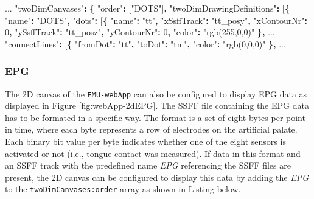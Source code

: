 \documentclass[]{book}
\newenvironment{Shaded}{\begin{snugshade}}{\end{snugshade}}
\newcommand{\DecValTok}[1]{\textcolor[rgb]{0.00,0.00,0.81}{#1}}
\newcommand{\NormalTok}[1]{#1}
\newcommand{\OperatorTok}[1]{\textcolor[rgb]{0.81,0.36,0.00}{\textbf{#1}}}
\newcommand{\StringTok}[1]{\textcolor[rgb]{0.31,0.60,0.02}{#1}}
\begin{document}
\begin{Shaded}
\begin{Highlighting}[]
\NormalTok{...}
\StringTok{"twoDimCanvases"}\OperatorTok{:} \OperatorTok{\{}
    \StringTok{"order"}\OperatorTok{:}\NormalTok{ [}\StringTok{"DOTS"}\NormalTok{]}\OperatorTok{,}
    \StringTok{"twoDimDrawingDefinitions"}\OperatorTok{:}\NormalTok{ [}\OperatorTok{\{}
        \StringTok{"name"}\OperatorTok{:} \StringTok{"DOTS"}\OperatorTok{,}
        \StringTok{"dots"}\OperatorTok{:}\NormalTok{ [}\OperatorTok{\{}
            \StringTok{"name"}\OperatorTok{:} \StringTok{"tt"}\OperatorTok{,}
            \StringTok{"xSsffTrack"}\OperatorTok{:} \StringTok{"tt_posy"}\OperatorTok{,}
            \StringTok{"xContourNr"}\OperatorTok{:} \DecValTok{0}\OperatorTok{,}
            \StringTok{"ySsffTrack"}\OperatorTok{:} \StringTok{"tt_posz"}\OperatorTok{,}
            \StringTok{"yContourNr"}\OperatorTok{:} \DecValTok{0}\OperatorTok{,}
            \StringTok{"color"}\OperatorTok{:} \StringTok{"rgb(255,0,0)"}
        \OperatorTok{\},}
\NormalTok{...}
    \StringTok{"connectLines"}\OperatorTok{:}\NormalTok{ [}\OperatorTok{\{}
        \StringTok{"fromDot"}\OperatorTok{:} \StringTok{"tt"}\OperatorTok{,}
        \StringTok{"toDot"}\OperatorTok{:} \StringTok{"tm"}\OperatorTok{,}
            \StringTok{"color"}\OperatorTok{:} \StringTok{"rgb(0,0,0)"}
    \OperatorTok{\},}
\NormalTok{...}
\end{Highlighting}
\end{Shaded}

\hypertarget{epg}{%
\subsubsection*{EPG}\label{epg}}

The 2D canvas of the \texttt{EMU-webApp} can also be configured to display EPG data as displayed in Figure \ref{fig:webApp-2dEPG}. The SSFF file containing the EPG data has to be formated in a specific way. The format is a set of eight bytes per point in time, where each byte represents a row of electrodes on the artificial palate. Each binary bit value per byte indicates whether one of the eight sensors is activated or not (i.e., tongue contact was measured). If data in this format and an SSFF track with the predefined name \emph{EPG} referencing the SSFF files are present, the 2D canvas can be configured to display this data by adding the \emph{EPG} to the \texttt{twoDimCanvases:order} array as shown in Listing below.
\end{document}
